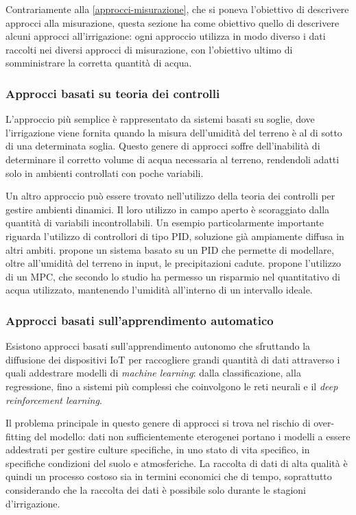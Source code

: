 \documentclass[12pt,a4paper,openright,twoside, openany]{book}
\begin{document}
Contrariamente alla \cref{approcci-misurazione}, che si poneva l'obiettivo di descrivere approcci alla misurazione, questa sezione ha come obiettivo quello di descrivere alcuni approcci all'irrigazione: ogni approccio utilizza in modo diverso i dati raccolti nei diversi approcci di misurazione, con l'obiettivo ultimo di somministrare la corretta quantità di acqua.

\subsubsection{Approcci basati su teoria dei controlli}

L'approccio più semplice è rappresentato da sistemi basati su soglie, dove l'irrigazione viene fornita quando la misura dell'umidità del terreno è al di sotto di una determinata soglia.
Questo genere di approcci soffre dell'inabilità di determinare il corretto volume di acqua necessaria al terreno, rendendoli adatti solo in ambienti controllati con poche variabili\cite{Zhao2023}.

Un altro approccio può essere trovato nell'utilizzo della teoria dei controlli per gestire ambienti dinamici. Il loro utilizzo in campo aperto è scoraggiato dalla quantità di variabili incontrollabili.
Un esempio particolarmente importante riguarda l'utilizzo di controllori di tipo \ac{PID}, soluzione già ampiamente diffusa in altri ambiti\cite{Astrom1995}.
\cite{Goodchild2015} propone un sistema basato su un PID che permette di modellare, oltre all'umidità del terreno in input, le precipitazioni cadute. \cite{Lozoya2016} propone l'utilizzo di un \ac{MPC}, che secondo lo studio ha permesso un risparmio nel quantitativo di acqua utilizzato, mantenendo l'umidità all'interno di un intervallo ideale.

\subsubsection{Approcci basati sull'apprendimento automatico}

Esistono approcci basati sull'apprendimento autonomo che sfruttando la diffusione dei dispositivi IoT per raccogliere grandi quantità di dati attraverso i quali addestrare modelli di \textit{machine learning}: dalla classificazione\cite{Gloria2021}, alla regressione\cite{Navarro2016}, fino a sistemi più complessi che coinvolgono le reti neurali\cite{Gong2022} e il \textit{deep reinforcement learning}\cite{Chen2021}.

Il problema principale in questo genere di approcci si trova nel rischio di over-fitting del modello: dati non sufficientemente eterogenei portano i modelli a essere addestrati per gestire culture specifiche, in uno stato di vita specifico, in specifiche condizioni del suolo e atmosferiche.
La raccolta di dati di alta qualità è quindi un processo costoso sia in termini economici che di tempo, soprattutto considerando che la raccolta dei dati è possibile solo durante le stagioni d'irrigazione.
\end{document}

